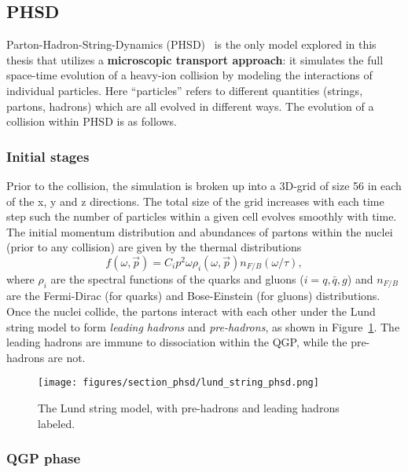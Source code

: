 \subsection{PHSD}

Parton-Hadron-String-Dynamics (PHSD)~\cite{PHSD1, PHSD2} is the only model explored in this thesis that utilizes a \textbf{microscopic transport approach}: it simulates the full space-time evolution of a heavy-ion collision by modeling the interactions of individual particles. Here ``particles'' refers to different quantities (strings, partons, hadrons) which are all evolved in different ways. The evolution of a collision within PHSD is as follows.

\subsubsection{Initial stages}
Prior to the collision, the simulation is broken up into a 3D-grid of size 56 in each of the x, y and z directions. The total size of the grid increases with each time step such the number of particles within a given cell evolves smoothly with time. The initial momentum distribution and abundances of partons within the nuclei (prior to any collision) are given by the thermal distributions
\begin{equation}
    f(\omega, \vec{p}) = C_i p^2 \omega \rho_i(\omega, \vec{p}) n_{F / B}(\omega / \tau),
\end{equation}
where $\rho_i$ are the spectral functions of the quarks and gluons ($i = q, \bar{q}, g$) and $n_{F / B}$ are the Fermi-Dirac (for quarks) and Bose-Einstein (for gluons) distributions. Once the nuclei collide, the partons interact with each other under the Lund string model to form \textit{leading hadrons} and \textit{pre-hadrons}, as shown in Figure~\ref{fig:lund_string_phsd}. The leading hadrons are immune to dissociation within the QGP, while the pre-hadrons are not. 

\begin{figure}[ht]
    \centering
    \texttt{[image: figures/section\_phsd/lund\_string\_phsd.png]}
    \caption{The Lund string model, with pre-hadrons and leading hadrons labeled.}
    \label{fig:lund_string_phsd}
\end{figure}

\subsubsection{QGP phase}




